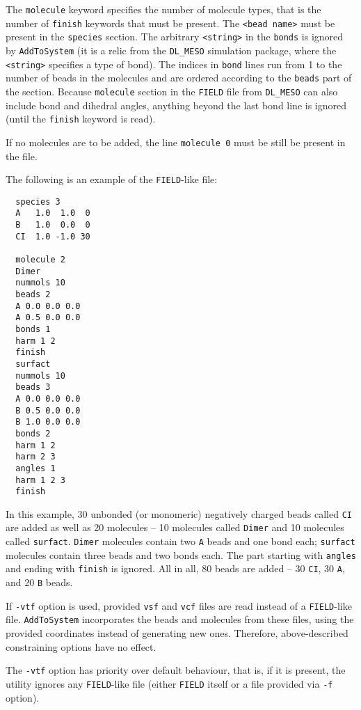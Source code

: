The \texttt{molecule} keyword specifies the number of molecule types, that
is the number of \texttt{finish} keywords that must be present. The
\texttt{<bead name>} must be present in the \texttt{species} section. The
arbitrary \texttt{<string>} in the \texttt{bonds} is ignored by
\texttt{AddToSystem} (it is a relic from the \texttt{DL\_MESO} simulation
package, where the \texttt{<string>} specifies a type of bond). The indices
in \texttt{bond} lines run from 1 to the number of beads in the molecules and are
ordered according to the \texttt{beads} part of the section. Because
\texttt{molecule} section in the \texttt{FIELD} file from \texttt{DL\_MESO}
can also include bond and dihedral angles, anything beyond the last
bond line is ignored (until the \texttt{finish} keyword is read).

If no molecules are to be added, the line \texttt{molecule 0} must be still
be present in the file.

The following is an example of the \texttt{FIELD}-like file:
\begin{verbatim}
  species 3
  A   1.0  1.0  0
  B   1.0  0.0  0
  CI  1.0 -1.0 30

  molecule 2
  Dimer
  nummols 10
  beads 2
  A 0.0 0.0 0.0
  A 0.5 0.0 0.0
  bonds 1
  harm 1 2
  finish
  surfact
  nummols 10
  beads 3
  A 0.0 0.0 0.0
  B 0.5 0.0 0.0
  B 1.0 0.0 0.0
  bonds 2
  harm 1 2
  harm 2 3
  angles 1
  harm 1 2 3
  finish
\end{verbatim}
In this example, 30 unbonded (or monomeric) negatively charged beads called
\texttt{CI} are added as well as 20 molecules -- 10 molecules called
\texttt{Dimer} and 10 molecules called \texttt{surfact}. \texttt{Dimer}
molecules contain two \texttt{A} beads and one bond each; \texttt{surfact}
molecules contain three beads and two bonds each. The part starting with
\texttt{angles} and ending with \texttt{finish} is ignored. All in all, 80
beads are added -- 30 \texttt{CI}, 30 \texttt{A}, and 20 \texttt{B} beads.

If \texttt{-vtf} option is used, provided \texttt{vsf} and \texttt{vcf}
files are read instead of a \texttt{FIELD}-like file. \texttt{AddToSystem}
incorporates the beads and molecules from these files, using the provided
coordinates instead of generating new ones. Therefore, above-described
constraining options have no effect.

The \texttt{-vtf} option has priority over default behaviour, that is, if
it is present, the utility ignores any \texttt{FIELD}-like file (either
\texttt{FIELD} itself or a file provided via \texttt{-f} option).

